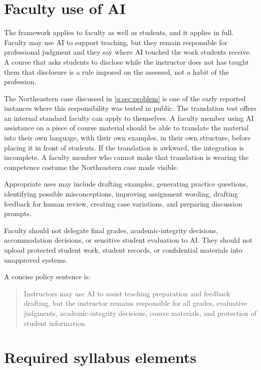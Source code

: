 \documentclass{SIAMbook2023}
\begin{document}
\section{Faculty use of AI}
\label{u:sec:faculty-use}%

The framework applies to faculty as well as students, and it applies in full. Faculty may use AI to support teaching, but they remain responsible for professional judgment and they say where AI touched the work students receive. A course that asks students to disclose while the instructor does not has taught them that disclosure is a rule imposed on the assessed, not a habit of the profession.

The Northeastern case discussed in \cref{u:sec:problem} is one of the early reported instances where this responsibility was tested in public. The translation test offers an internal standard faculty can apply to themselves. A faculty member using AI assistance on a piece of course material should be able to translate the material into their own language, with their own examples, in their own structure, before placing it in front of students. If the translation is awkward, the integration is incomplete. A faculty member who cannot make that translation is wearing the competence costume the Northeastern case made visible.

Appropriate uses may include drafting examples, generating practice questions, identifying possible misconceptions, improving assignment wording, drafting feedback for human review, creating case variations, and preparing discussion prompts.

Faculty should not delegate final grades, academic-integrity decisions, accommodation decisions, or sensitive student evaluation to AI. They should not upload protected student work, student records, or confidential materials into unapproved systems.

A concise policy sentence is:

\begin{quote}
Instructors may use AI to assist teaching preparation and feedback drafting, but the instructor remains responsible for all grades, evaluative judgments, academic-integrity decisions, course materials, and protection of student information.
\end{quote}

\section{Required syllabus elements}
\label{u:sec:syllabus}%
\end{document}

